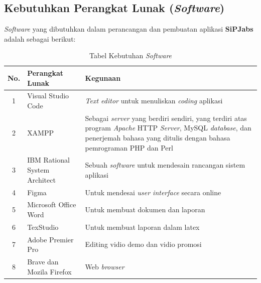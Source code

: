 \newpage
\subsection{Kebutuhkan Perangkat Lunak (\textit{Software})}

\textit{Software} yang dibutuhkan dalam perancangan dan pembuatan aplikasi \textbf{SiPJabs}
adalah sebagai berikut:

\begin{table}[H]
	\centering
	\caption{Tabel Kebutuhan \textit{Software}}
	\begin{tabular}{ | c | l | p{65mm} | }
		\hline
		No. & Perangkat Lunak & Kegunaan \\
		\hline
		
		1 & Visual Studio Code & \textit{Text editor} untuk menuliskan \textit{coding} aplikasi \\
				
		\hline
		
		2 & XAMPP & Sebagai \textit{server} yang berdiri sendiri, yang terdiri atas program \textit{Apache} HTTP \textit{Server}, MySQL \textit{database}, dan penerjemah bahasa yang ditulis dengan bahasa pemrograman PHP dan Perl \\
		
		\hline
		
		3 & IBM Rational System Architect  & Sebuah \textit{software} untuk mendesain rancangan sistem aplikasi \\
		
		\hline
		
		4 & Figma & Untuk mendesai \textit{user interface} secara online \\
		
		
		\hline
		
		5 & Microsoft Office Word & Untuk membuat dokumen dan laporan \\
		
		\hline
		
		6 & TexStudio & Untuk membuat laporan dalam latex \\
		
		\hline
		
		7 & Adobe Premier Pro & Editing vidio demo dan vidio promosi \\
		
		\hline
		
		8 & Brave dan Mozila Firefox & Web \textit{browser} \\
		
		\hline
	\end{tabular}
\end{table}

